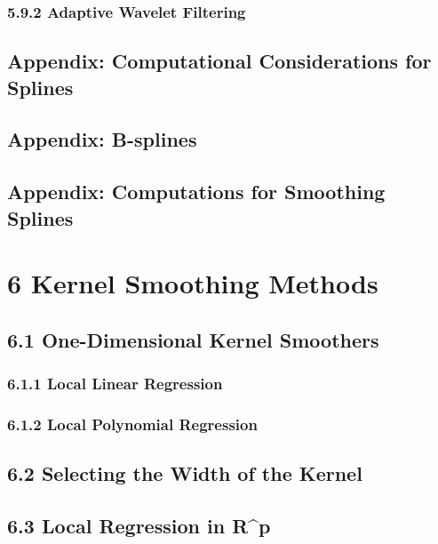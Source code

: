 \documentclass[11pt]{article}
\begin{document}
\subsubsection{5.9.2 Adaptive Wavelet
Filtering}\label{adaptive-wavelet-filtering}

\subsection{Appendix: Computational Considerations for
Splines}\label{appendix-computational-considerations-for-splines}

\subsection{Appendix: B-splines}\label{appendix-b-splines}

\subsection{Appendix: Computations for Smoothing
Splines}\label{appendix-computations-for-smoothing-splines}

    \section{6 Kernel Smoothing Methods}\label{kernel-smoothing-methods}

\subsection{6.1 One-Dimensional Kernel
Smoothers}\label{one-dimensional-kernel-smoothers}

\subsubsection{6.1.1 Local Linear
Regression}\label{local-linear-regression}

\subsubsection{6.1.2 Local Polynomial
Regression}\label{local-polynomial-regression}

\subsection{6.2 Selecting the Width of the
Kernel}\label{selecting-the-width-of-the-kernel}

\subsection{6.3 Local Regression in
R\^{}p}\label{local-regression-in-rp}
\end{document}
